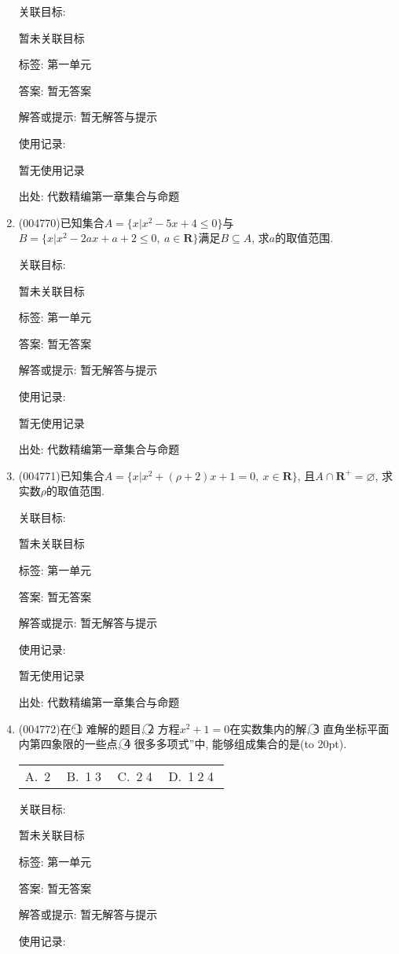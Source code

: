 \documentclass[10pt,a4paper]{article}
\newcommand{\bracket}[1]{(\hbox to #1pt{})}
\newcommand{\fourch}[4]{\par\begin{tabular}{p{.23\textwidth}p{.23\textwidth}p{.23\textwidth}p{.23\textwidth}}
A.~#1 &B.~#2& C.~#3& D.~#4
\end{tabular}}
\begin{document}
\begin{enumerate}[1.]
关联目标:

暂未关联目标



标签: 第一单元

答案: 暂无答案

解答或提示: 暂无解答与提示

使用记录:

暂无使用记录


出处: 代数精编第一章集合与命题
\item { (004770)}已知集合$A=\{x|x^2-5x+4\le 0\}$与$B=\{x|x^2-2ax+a+2\le 0,\ a\in \mathbf{R}\}$满足$B\subseteq A$, 求$a$的取值范围.


关联目标:

暂未关联目标



标签: 第一单元

答案: 暂无答案

解答或提示: 暂无解答与提示

使用记录:

暂无使用记录


出处: 代数精编第一章集合与命题
\item { (004771)}已知集合$A=\{x|x^2 +(\rho +2)x+1=0, \ x\in \mathbf{R}\}$, 且$A\cap \mathbf{R}^+=\varnothing$, 求实数$\rho$的取值范围.


关联目标:

暂未关联目标



标签: 第一单元

答案: 暂无答案

解答或提示: 暂无解答与提示

使用记录:

暂无使用记录


出处: 代数精编第一章集合与命题
\item { (004772)}在``\textcircled{1} 难解的题目, \textcircled{2} 方程$x^2+1=0$在实数集内的解, \textcircled{3} 直角坐标平面内第四象限的一些点, \textcircled{4} 很多多项式''中, 能够组成集合的是\bracket{20}.
\fourch{\textcircled{2}}{\textcircled{1}\textcircled{3}}{\textcircled{2}\textcircled{4}}{\textcircled{1}\textcircled{2}\textcircled{4}}


关联目标:

暂未关联目标



标签: 第一单元

答案: 暂无答案

解答或提示: 暂无解答与提示

使用记录:


\end{enumerate}
\end{document}
